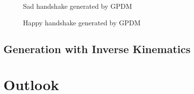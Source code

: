 \documentclass[10pt]{beamer}
\begin{document}
\begin{frame}
  \begin{figure}
      \begin{center}
      \end{center}
      \caption{Sad handshake generated by GPDM}
      \label{fig:exampleGenerated}
    \end{figure}
\end{frame}

\begin{frame}
  \begin{figure}
      \begin{center}
      \end{center}
      \caption{Happy handshake generated by GPDM}
      \label{fig:exampleGenerated2}
    \end{figure}
\end{frame}

\subsection{Generation with Inverse Kinematics}
\begin{frame}
 
\end{frame}


\section{Outlook}
\end{document}
